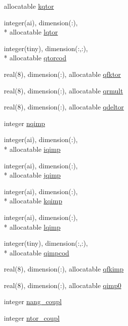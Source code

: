 \begin{DoxyCompactItemize}
allocatable \hyperlink{classqatom_a77756a8eee8ab11823bd3ac6f10153b8}{kqtor}
\item 
integer(ai), dimension(\-:), \\*
allocatable \hyperlink{classqatom_a6c4163a7d53e88f2062f1f52f7641e15}{lqtor}
\item 
integer(tiny), dimension(\-:,\-:), \\*
allocatable \hyperlink{classqatom_a958c8fbc0b25411aa55098f9bc4755c2}{qtorcod}
\item 
real(8), dimension(\-:), allocatable \hyperlink{classqatom_a9d161240de494aa5e3246b9e57a600bc}{qfktor}
\item 
real(8), dimension(\-:), allocatable \hyperlink{classqatom_a75748cbd598a3a40c2fa8589e3306cc2}{qrmult}
\item 
real(8), dimension(\-:), allocatable \hyperlink{classqatom_a6cb08436e73ba064c40610f3c1692a9e}{qdeltor}
\item 
integer \hyperlink{classqatom_af6bd0663972383ffa21ce1ee24b7ae78}{nqimp}
\item 
integer(ai), dimension(\-:), \\*
allocatable \hyperlink{classqatom_acf0713070153169232f5dc042a5b41fa}{iqimp}
\item 
integer(ai), dimension(\-:), \\*
allocatable \hyperlink{classqatom_aec8261584efc3ec4cf10a8b4c030ffb5}{jqimp}
\item 
integer(ai), dimension(\-:), \\*
allocatable \hyperlink{classqatom_ab4e982414614c382ce533e5a67a5b8a6}{kqimp}
\item 
integer(ai), dimension(\-:), \\*
allocatable \hyperlink{classqatom_acf6c9a22703cc70e002c3b47528fa0a2}{lqimp}
\item 
integer(tiny), dimension(\-:,\-:), \\*
allocatable \hyperlink{classqatom_ae79130031f46f5c006af90af79bdd169}{qimpcod}
\item 
real(8), dimension(\-:), allocatable \hyperlink{classqatom_a365c7af276378468e52670e7da26e41a}{qfkimp}
\item 
real(8), dimension(\-:), allocatable \hyperlink{classqatom_ab74e49ee8c35e3aa9ddebdcb7177b382}{qimp0}
\item 
integer \hyperlink{classqatom_a08d7f9f7144e8187c01c14f85ea1672e}{nang\-\_\-coupl}
\item 
integer \hyperlink{classqatom_ad94d81bad971192e231778440b5d818c}{ntor\-\_\-coupl}
\item 

\end{DoxyCompactItemize}
